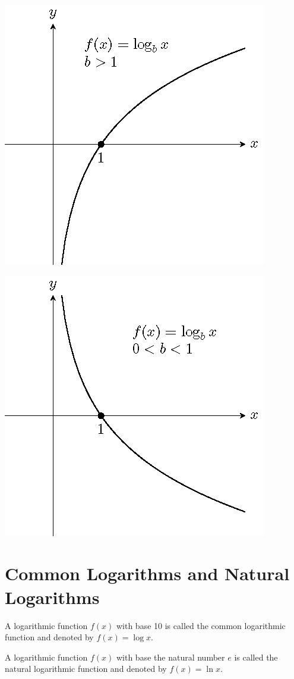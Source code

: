 \documentclass[
  en,11pt]{elegantbook}
\begin{document}
\begin{multicols}{2}

\begin{center}\includegraphics[width=0.5\linewidth]{figs/tikz-example-log-function-graph-1} \end{center}

\begin{center}\includegraphics[width=0.5\linewidth]{figs/tikz-example-log-function-graph-2} \end{center}

\end{multicols}

\hypertarget{common-logarithms-and-natural-logarithms}{%
\section{Common Logarithms and Natural Logarithms}\label{common-logarithms-and-natural-logarithms}}

A logarithmic function \(f(x)\) with base 10 is called the common logarithmic function and denoted by \(f(x)=\log x\).

A logarithmic function \(f(x)\) with base the natural number \(e\) is called the natural logarithmic function and denoted by \(f(x)=\ln x\).
\end{document}
